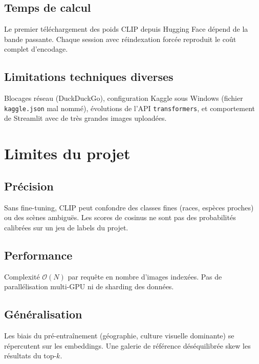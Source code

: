 \documentclass[11pt,a4paper,openany]{report}
\begin{document}
\section{Temps de calcul}

Le premier téléchargement des poids CLIP depuis Hugging Face dépend de la bande passante. Chaque session avec réindexation forcée reproduit le coût complet d'encodage.

\section{Limitations techniques diverses}

Blocages réseau (DuckDuckGo), configuration Kaggle sous Windows (fichier \texttt{kaggle.json} mal nommé), évolutions de l'API \texttt{transformers}, et comportement de Streamlit avec de très grandes images uploadées.

\chapter{Limites du projet}

\section{Précision}

Sans fine-tuning, CLIP peut confondre des classes fines (races, espèces proches) ou des scènes ambiguës. Les scores de cosinus ne sont pas des probabilités calibrées sur un jeu de labels du projet.

\section{Performance}

Complexité $\mathcal{O}(N)$ par requête en nombre d'images indexées. Pas de parallélisation multi-GPU ni de sharding des données.

\section{Généralisation}

Les biais du pré-entraînement (géographie, culture visuelle dominante) se répercutent sur les embeddings. Une galerie de référence déséquilibrée skew les résultats du top-$k$.
\end{document}
